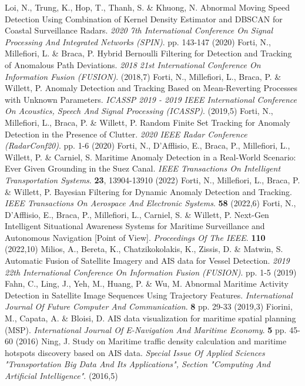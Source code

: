 Loi, N., Trung, K., Hop, T., Thanh, S. \& Khuong, N. Abnormal Moving Speed Detection Using Combination of Kernel Density Estimator and DBSCAN for Coastal Surveillance Radars. {\em 2020 7th International Conference On Signal Processing And Integrated Networks (SPIN)}. pp. 143-147 (2020)
Forti, N., Millefiori, L. \& Braca, P. Hybrid Bernoulli Filtering for Detection and Tracking of Anomalous Path Deviations. {\em 2018 21st International Conference On Information Fusion (FUSION)}. (2018,7)
Forti, N., Millefiori, L., Braca, P. \& Willett, P. Anomaly Detection and Tracking Based on Mean-Reverting Processes with Unknown Parameters. {\em ICASSP 2019 - 2019 IEEE International Conference On Acoustics, Speech And Signal Processing (ICASSP)}. (2019,5)
Forti, N., Millefiori, L., Braca, P. \& Willett, P. Random Finite Set Tracking for Anomaly Detection in the Presence of Clutter. {\em 2020 IEEE Radar Conference (RadarConf20)}. pp. 1-6 (2020)
Forti, N., D'Afflisio, E., Braca, P., Millefiori, L., Willett, P. \& Carniel, S. Maritime Anomaly Detection in a Real-World Scenario: Ever Given Grounding in the Suez Canal. {\em IEEE Transactions On Intelligent Transportation Systems}. \textbf{23}, 13904-13910 (2022)
Forti, N., Millefiori, L., Braca, P. \& Willett, P. Bayesian Filtering for Dynamic Anomaly Detection and Tracking. {\em IEEE Transactions On Aerospace And Electronic Systems}. \textbf{58} (2022,6)
Forti, N., D'Afflisio, E., Braca, P., Millefiori, L., Carniel, S. \& Willett, P. Next-Gen Intelligent Situational Awareness Systems for Maritime Surveillance and Autonomous Navigation [Point of View]. {\em Proceedings Of The IEEE}. \textbf{110} (2022,10)
Milios, A., Bereta, K., Chatzikokolakis, K., Zissis, D. \& Matwin, S. Automatic Fusion of Satellite Imagery and AIS data for Vessel Detection. {\em 2019 22th International Conference On Information Fusion (FUSION)}. pp. 1-5 (2019)
Fahn, C., Ling, J., Yeh, M., Huang, P. \& Wu, M. Abnormal Maritime Activity Detection in Satellite Image Sequences Using Trajectory Features. {\em International Journal Of Future Computer And Communication}. \textbf{8} pp. 29-33 (2019,3)
Fiorini, M., Capata, A. \& Bloisi, D. AIS data visualization for maritime spatial planning (MSP). {\em International Journal Of E-Navigation And Maritime Economy}. \textbf{5} pp. 45-60 (2016)
Ning, J. Study on Maritime traffic density calculation and maritime hotspots discovery based on AIS data. {\em Special Issue Of Applied Sciences "Transportation Big Data And Its Applications", Section "Computing And Artificial Intelligence"}. (2016,5)
